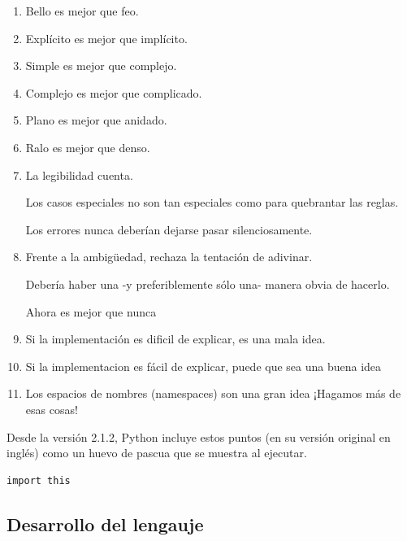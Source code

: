 \documentclass[a4paper]{report}
\begin{document}
\begin{enumerate}
  \item Bello es mejor que feo.
  \item Explícito es mejor que implícito.
  \item Simple es mejor que complejo.
  \item Complejo es mejor que complicado.
  \item Plano es mejor que anidado.
  \item Ralo es mejor que denso.
  \item La legibilidad cuenta.
  \begin{item}
    Los casos especiales no son tan especiales como para quebrantar las reglas.
  \end{item}
  \begin{item}
    Los errores nunca deberían dejarse pasar silenciosamente.
  \end{item}
  \item {Frente a la ambigüedad, rechaza la tentación de adivinar.}
  \begin{item}
    Debería haber una -y preferiblemente sólo una- manera obvia de hacerlo. 
  \end{item}
  \begin{item}
    Ahora es mejor que nunca
  \end{item}
  \item {Si la implementación es dificil de explicar, es una mala idea.}
  \item {Si la implementacion es fácil de explicar, puede que sea una buena
idea}
  \item {Los espacios de nombres (namespaces) son una gran idea ¡Hagamos más de
esas cosas!}
\end{enumerate}
Desde la versión 2.1.2, Python incluye estos puntos (en su versión original en
inglés) 
como un huevo de pascua que se muestra al ejecutar.
\begin{lstlisting}[style=consola]
import this
\end{lstlisting}

\subsection{Desarrollo del lengauje}
\end{document}
